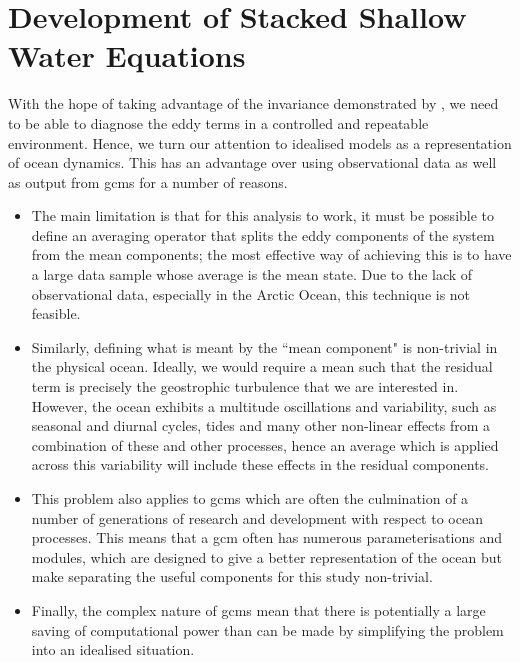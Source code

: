 \documentclass[12pt,a4paper]{report}
\begin{document}
\chapter{Development of Stacked Shallow Water Equations}
\label{sweq}

With the hope of taking advantage of the invariance demonstrated by 
\cite{maddison2013eliassen}, we need to be able to diagnose the
eddy terms in a controlled and repeatable environment. Hence, we turn our attention to
idealised models as a representation of ocean dynamics. This has an advantage 
over using observational data as well as output from \glspl{gcm} for a number of reasons.
\begin{itemize}
	\item The main limitation is that for this analysis to work, it must be possible to define an
	averaging operator that splits the eddy components of the system from the mean
	components; the most effective way of achieving this is to have a large data sample
	whose average is the mean state. Due to the lack of observational data, especially in the
	Arctic Ocean, this  technique is not feasible.
	\item Similarly, defining what is meant by the ``mean component" is non-trivial in the physical ocean. Ideally, we would require a mean such that the residual term is precisely the 
	geostrophic turbulence that we are interested in. However, the ocean exhibits a multitude 
	oscillations and variability, such as seasonal and diurnal cycles, tides and many other
	non-linear effects from a combination of these and other processes, hence an average which
	is applied across this variability will include these effects in the residual components.
	\item This problem also applies to \glspl{gcm} which are often the culmination of 
	a number of generations of research and development with respect to ocean processes.
	This means that a \gls{gcm} often has numerous parameterisations and modules, which are
	designed to give a better representation of the ocean but make separating the useful components
	for this study non-trivial. 
	\item Finally, the complex nature of \glspl{gcm} mean that there is potentially a large saving
	of computational power than can be made by simplifying the problem into an idealised situation.
\end{itemize}
\end{document}
